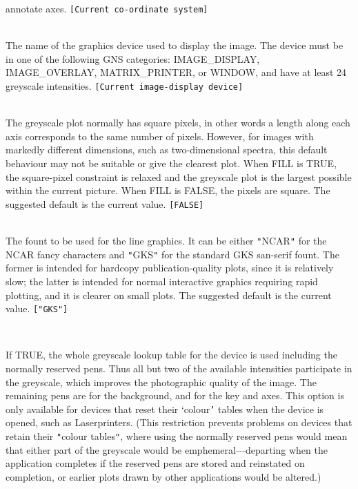 \documentclass[twoside,11pt]{article}
\newcommand{\sstsubsection}[1]{ \item[{#1}] \mbox{} \\}
\newcommand{\sstsubsection}[1]{\item[{#1}]}
\begin{document}
{{{         annotate axes.  {\tt [Current co-ordinate system]}
      }
      \sstsubsection{
         DEVICE = DEVICE (Read)
      }{
         The name of the graphics device used to display the image.
         The device must be in one of the following GNS categories:
         IMAGE\_DISPLAY, IMAGE\_OVERLAY, MATRIX\_PRINTER, or WINDOW, and
         have at least 24 greyscale intensities.
         {\tt [Current image-display device]}
      }
      \sstsubsection{
         FILL = \_LOGICAL (Read)
      }{
         The greyscale plot normally has square pixels, in other words
         a length along each axis corresponds to the same number of
         pixels.  However, for images with markedly different
         dimensions, such as two-dimensional spectra, this default
         behaviour may not be suitable or give the clearest plot.  When
         FILL is TRUE, the square-pixel constraint is relaxed and the
         greyscale plot is the largest possible within the current
         picture.  When FILL is FALSE, the pixels are square.  The
         suggested default is the current value.  {\tt [FALSE]}
      }
      \sstsubsection{
         FONT = LITERAL (Read)
      }{
         The fount to be used for the line graphics.  It can be either
         {\tt "}NCAR{\tt "} for the NCAR fancy characters and {\tt "}GKS{\tt "} for the standard
         GKS san-serif fount.   The former is intended for hardcopy
         publication-quality plots, since it is relatively slow; the
         latter is intended for normal interactive graphics requiring
         rapid plotting, and it is clearer on small plots. The
         suggested default is the current value. {\tt [{\tt "}GKS{\tt "}]}
      }
      \sstsubsection{
         FULL = \_LOGICAL (Read)
      }{
         If TRUE, the whole greyscale lookup table for the device is
         used including the normally reserved pens.  Thus all but two
         of the available intensities participate in the greyscale,
         which improves the photographic quality of the image.  The
         remaining pens are for the background, and for the key and
         axes.  This option is only available for devices that reset
         their `colour{\tt '} tables when the device is opened, such as
         Laserprinters. (This restriction prevents problems on devices
         that retain their {\tt "}colour tables{\tt "}, where using the normally
         reserved pens would mean that either part of the greyscale
         would be emphemeral---departing when the application
         completes if the reserved pens are stored and reinstated on
         completion, or earlier plots drawn by other applications would
         be altered.)

}}}
\end{document}
